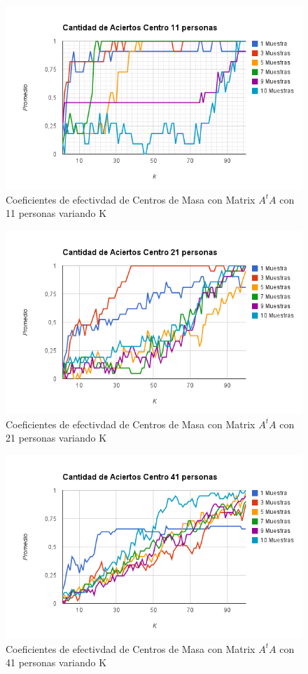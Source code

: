 \begin{figure}[H]
\includegraphics[width=1\textwidth]{img/image13.png}
     \caption{Coeficientes de efectivdad de Centros de Masa con Matrix $A^tA$ con 11 personas variando K}
\end{figure}

\begin{figure}[H]
\includegraphics[width=1\textwidth]{img/image14.png}
     \caption{Coeficientes de efectivdad de Centros de Masa con Matrix $A^tA$ con 21 personas variando K}
\end{figure}

\begin{figure}[H]
\includegraphics[width=1\textwidth]{img/image15.png}
     \caption{Coeficientes de efectivdad de Centros de Masa con Matrix $A^tA$ con 41 personas variando K}
\end{figure}


